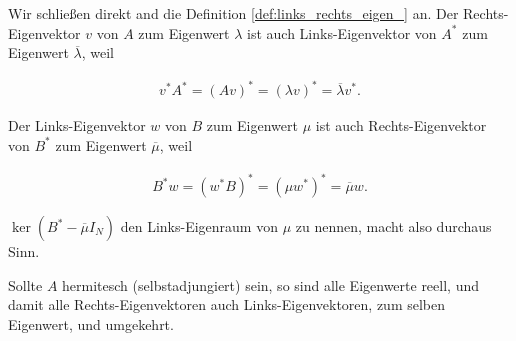 \begin{remark} \label{rem:links_rechts_eigen_}

    Wir schließen direkt and die Definition \ref{def:links_rechts_eigen_} an.
    Der Rechts-Eigenvektor $v$ von $A$ zum Eigenwert $\lambda$ ist auch Links-Eigenvektor von $A^\ast$ zum Eigenwert $\overline \lambda$, weil

    \begin{align*}
        v^\ast A^\ast
        =
        (A v)^\ast
        =
        (\lambda v)^\ast
        =
        \overline \lambda v^\ast.
    \end{align*}

    Der Links-Eigenvektor $w$ von $B$ zum Eigenwert $\mu$ ist auch Rechts-Eigenvektor von $B^\ast$ zum Eigenwert $\overline \mu$, weil

    \begin{align*}
        B^\ast w
        =
        (w^\ast B)^\ast
        =
        (\mu w^\ast)^\ast
        =
        \overline \mu w.
    \end{align*}

    $\ker (B^\ast - \overline \mu I_N)$ den Links-Eigenraum von $\mu$ zu nennen, macht also durchaus Sinn.

    Sollte $A$ hermitesch (selbstadjungiert) sein, so sind alle Eigenwerte reell, und damit alle Rechts-Eigenvektoren auch Links-Eigenvektoren, zum selben Eigenwert, und umgekehrt.

\end{remark}

\begin{comment}

    $A^\ast$ ist tatsächlich die Adjungierte von $A$ im Sinne der Funktionalanalysis, weil $\Forall x, y \in \C^N:$

    \begin{align*}
        (A x, y)_2
        =
        y^\ast A x
        =
        (A^\ast y)^\ast x
        =
        (x, A^\ast y)_2.
    \end{align*}

    Nun ist $\overline \lambda$ Eigenwert von $A^\ast$ mit derselben algebraischen Vielfachheit wie $\lambda$, weil

    \begin{align*}
        \chi_{A^\ast}(\lambda)
        =
        \det(A^\ast - \lambda I_N)
        =
        \overline{\det(A - \lambda I_N)^\top}
        =
        \overline{\chi_A(\lambda)}.
    \end{align*}

\end{comment}

